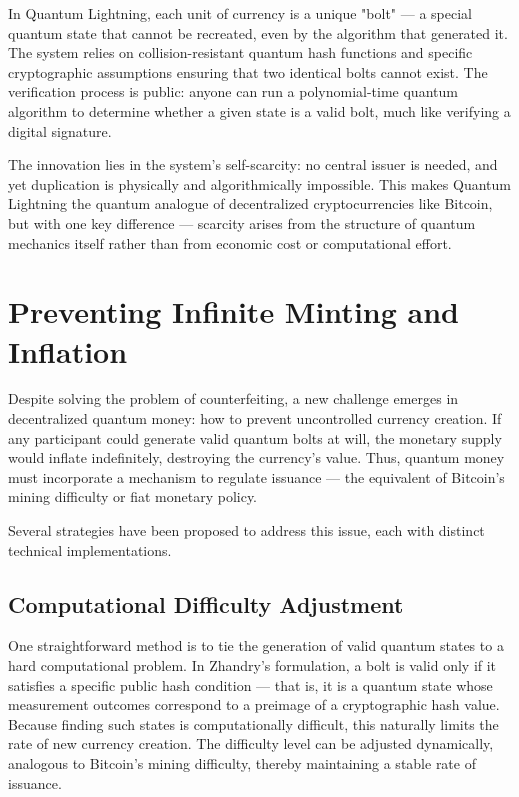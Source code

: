 \documentclass[a4paper,10.5pt,twoside]{article}
\begin{document}
In Quantum Lightning, each unit of currency is a unique "bolt" — a special quantum state that cannot be recreated, even by the algorithm that generated it. The system relies on collision-resistant quantum hash functions and specific cryptographic assumptions ensuring that two identical bolts cannot exist. The verification process is public: anyone can run a polynomial-time quantum algorithm to determine whether a given state is a valid bolt, much like verifying a digital signature.

The innovation lies in the system's self-scarcity: no central issuer is needed, and yet duplication is physically and algorithmically impossible. This makes Quantum Lightning the quantum analogue of decentralized cryptocurrencies like Bitcoin, but with one key difference — scarcity arises from the structure of quantum mechanics itself rather than from economic cost or computational effort.

\section{Preventing Infinite Minting and Inflation}\label{s:3}
Despite solving the problem of counterfeiting, a new challenge emerges in decentralized quantum money: how to prevent uncontrolled currency creation. If any participant could generate valid quantum bolts at will, the monetary supply would inflate indefinitely, destroying the currency's value. Thus, quantum money must incorporate a mechanism to regulate issuance — the equivalent of Bitcoin's mining difficulty or fiat monetary policy.

Several strategies have been proposed to address this issue, each with distinct technical implementations.

\subsection{Computational Difficulty Adjustment}\label{s:3.1}
One straightforward method is to tie the generation of valid quantum states to a hard computational problem. In Zhandry's formulation, a bolt is valid only if it satisfies a specific public hash condition — that is, it is a quantum state whose measurement outcomes correspond to a preimage of a cryptographic hash value. Because finding such states is computationally difficult, this naturally limits the rate of new currency creation. The difficulty level can be adjusted dynamically, analogous to Bitcoin's mining difficulty, thereby maintaining a stable rate of issuance.
\end{document}
